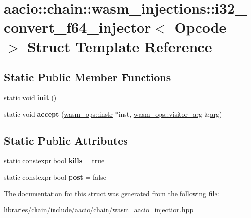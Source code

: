 \hypertarget{structaacio_1_1chain_1_1wasm__injections_1_1i32__convert__f64__injector}{}\section{aacio\+:\+:chain\+:\+:wasm\+\_\+injections\+:\+:i32\+\_\+convert\+\_\+f64\+\_\+injector$<$ Opcode $>$ Struct Template Reference}
\label{structaacio_1_1chain_1_1wasm__injections_1_1i32__convert__f64__injector}
\subsection*{Static Public Member Functions}
\begin{DoxyCompactItemize}
\item 
\mbox{\label{structaacio_1_1chain_1_1wasm__injections_1_1i32__convert__f64__injector_af38634f39ce9eac584f715c5afa3c93a}} 
static void {\bfseries init} ()
\item 
\mbox{\label{structaacio_1_1chain_1_1wasm__injections_1_1i32__convert__f64__injector_aec88f16abf97a1a0d0f858b0d1da5944}} 
static void {\bfseries accept} (\mbox{\hyperlink{structaacio_1_1chain_1_1wasm__ops_1_1instr}{wasm\+\_\+ops\+::instr}} $\ast$inst, \mbox{\hyperlink{structaacio_1_1chain_1_1wasm__ops_1_1visitor__arg}{wasm\+\_\+ops\+::visitor\+\_\+arg}} \&\mbox{\hyperlink{unionarg}{arg}})
\end{DoxyCompactItemize}
\subsection*{Static Public Attributes}
\begin{DoxyCompactItemize}
\item 
\mbox{\label{structaacio_1_1chain_1_1wasm__injections_1_1i32__convert__f64__injector_a244f118bc853863fbb193fc354bae476}} 
static constexpr bool {\bfseries kills} = true
\item 
\mbox{\label{structaacio_1_1chain_1_1wasm__injections_1_1i32__convert__f64__injector_aa607d42819fb91f6aeaf34e54c27666d}} 
static constexpr bool {\bfseries post} = false
\end{DoxyCompactItemize}


The documentation for this struct was generated from the following file\+:\begin{DoxyCompactItemize}
\item 
libraries/chain/include/aacio/chain/wasm\+\_\+aacio\+\_\+injection.\+hpp\end{DoxyCompactItemize}
